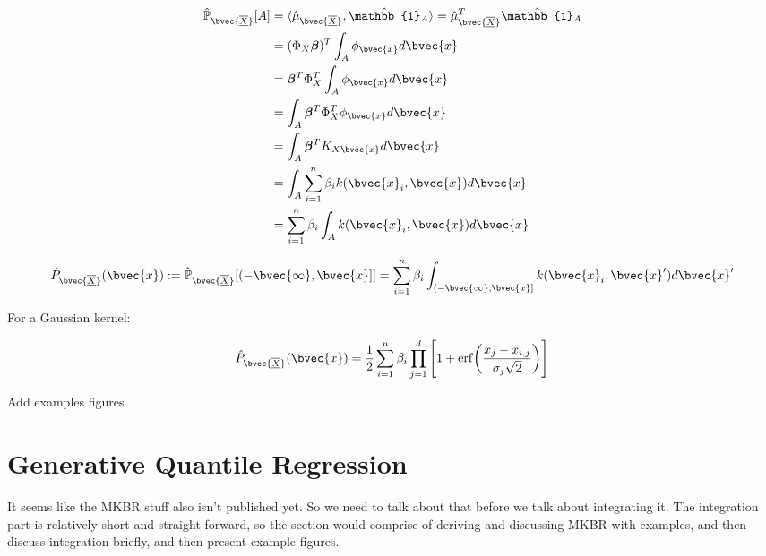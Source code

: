 \documentclass[twoside]{article} \usepackage{aistats2017}
\newcommand{\rv}[1]{\underline{\overline{#1}}}
\newcommand{\warn}[1]{{\color{red} #1}}
\begin{document}
		\begin{equation}
		\begin{aligned}
		\hat{\mathbb{P}}_{\bvec{\rv{X}}}[A] &= \langle \hat{\mu}_{\bvec{\rv{X}}}, \hat{\mathbb{1}}_{A} \rangle = \hat{\mu}_{\bvec{\rv{X}}}^{T}\hat{\mathbb{1}}_{A} \\
		&= (\Phi_{X} \bm{\beta})^{T} \int_{A} \phi_{\bvec{x}} d\bvec{x} \\
		&= \bm{\beta}^{T} \Phi_{X}^{T} \int_{A} \phi_{\bvec{x}} d\bvec{x} \\
		&= \int_{A} \bm{\beta}^{T} \Phi_{X}^{T} \phi_{\bvec{x}} d\bvec{x} \\
		&= \int_{A} \bm{\beta}^{T} K_{X \bvec{x}} d\bvec{x} \\
		&= \int_{A} \sum_{i = 1}^{n} \beta_{i} k(\bvec{x}_{i}, \bvec{x}) d\bvec{x} \\
		&= \sum_{i = 1}^{n} \beta_{i} \int_{A}  k(\bvec{x}_{i}, \bvec{x}) d\bvec{x} \\
		\end{aligned}
		\label{eq:smooth_empirical_distribution}
		\end{equation}	
		
		\begin{equation}
		\hat{P}_{\bvec{\rv{X}}}(\bvec{x}) := \hat{\mathbb{P}}_{\bvec{\rv{X}}}[(-\bvec{\infty}, \bvec{x}]] = \sum_{i = 1}^{n} \beta_{i} \int_{(-\bvec{\infty}, \bvec{x}]}  k(\bvec{x}_{i}, \bvec{x}') d\bvec{x}'
		\label{eq:smooth_empirical_cdf}
		\end{equation}
		
		For a Gaussian kernel:
		
		\begin{equation}
		\hat{P}_{\bvec{\rv{X}}}(\bvec{x}) = \frac{1}{2} \sum_{i = 1}^{n} \beta_{i} \prod_{j = 1}^{d} \Bigg[1 + \mathrm{erf}\bigg(\frac{x_{j} - x_{i, j}}{\sigma_{j} \sqrt{2}}\bigg)\Bigg]
		\end{equation}
		
		\warn{Add examples figures}

\section{Generative Quantile Regression}

	\warn{It seems like the MKBR stuff also isn't published yet. So we need to talk about that before we talk about integrating it. The integration part is relatively short and straight forward, so the section would comprise of deriving and discussing MKBR with examples, and then discuss integration briefly, and then present example figures.}
	
\end{document}
